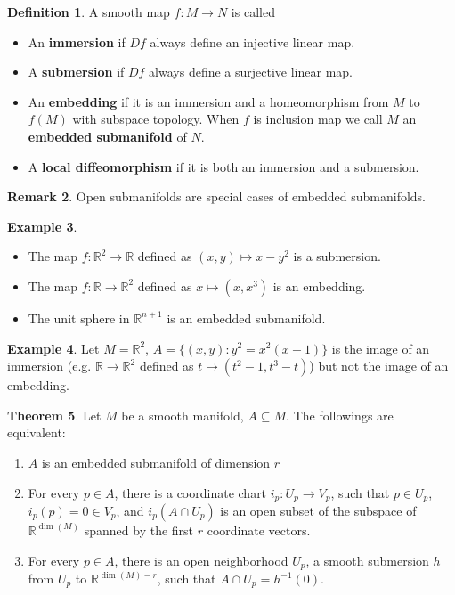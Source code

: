 \documentclass{article}
\theoremstyle{definition}
\newtheorem{thm}{Theorem}[section]
\newtheorem{dfn}[thm]{Definition}
\newtheorem{rmk}[thm]{Remark}
\newtheorem{exm}[thm]{Example}
\begin{document}
\begin{dfn}
    A smooth map $f: M\rightarrow N$ is called
    \begin{itemize}
        \item An {\bf immersion} if $Df$ always define an injective linear map.
        \item A {\bf submersion} if $Df$ always define a surjective linear map.
        \item An {\bf embedding} if it is an immersion and a homeomorphism from $M$ to $f(M)$ with subspace topology. When $f$ is inclusion map we call $M$ an {\bf embedded submanifold} of $N$.
        \item A {\bf local diffeomorphism} if it is both an immersion and a submersion.
    \end{itemize}
\end{dfn}

\begin{rmk}
    Open submanifolds are special cases of embedded submanifolds.
\end{rmk}

\begin{exm}
\begin{itemize}
\item The map $f: \mathbb{R}^2\rightarrow \mathbb{R}$ defined as $(x, y)\mapsto x-y^2$ is a submersion.
\item The map $f: \mathbb{R}\rightarrow \mathbb{R}^2$ defined as $x\mapsto (x, x^3)$ is an embedding.
\item The unit sphere in $\mathbb{R}^{n+1}$ is an embedded submanifold.
\end{itemize}
\end{exm}

\begin{exm}
    Let $M=\mathbb{R}^2$, $A=\{(x, y): y^2=x^2(x+1)\}$ is the image of an immersion (e.g. $\mathbb{R}\rightarrow \mathbb{R}^2$ defined as $t\mapsto (t^2-1, t^3-t)$) but not the image of an embedding.
\end{exm}

\begin{thm}
    Let $M$ be a smooth manifold, $A\subseteq M$. The followings are equivalent:
    \begin{enumerate}
        \item $A$ is an embedded submanifold of dimension $r$
        \item For every $p\in A$, there is a coordinate chart $i_p: U_p\rightarrow V_p$, such that $p\in U_p$, $i_p(p)=0\in V_p$, and $i_p(A\cap U_p)$ is an open subset of the subspace of $\mathbb{R}^{\dim(M)}$ spanned by the first $r$ coordinate vectors.
        \item For every $p\in A$, there is an open neighborhood $U_p$, a smooth submersion $h$ from $U_p$ to $\mathbb{R}^{\dim(M)-r}$, such that $A\cap U_p=h^{-1}(0)$.
    \end{enumerate}
\end{thm}
\end{document}
